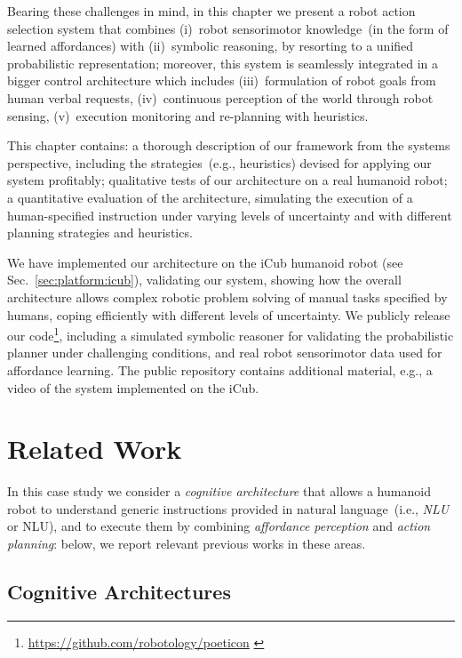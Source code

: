 Bearing these challenges in mind, in this chapter we present a robot action selection system that combines
(i)~robot sensorimotor knowledge~(in the form of learned affordances) with
(ii)~symbolic reasoning, by resorting to a unified probabilistic representation; moreover, this system is seamlessly integrated in a bigger control architecture which includes
(iii)~formulation of robot goals from human verbal requests,
(iv)~continuous perception of the world through robot sensing,
(v)~execution monitoring and re-planning with heuristics.

This chapter contains:
a thorough description of our framework from the systems perspective, including the strategies~(e.g., heuristics) devised for applying our system profitably;
qualitative tests of our architecture on a real humanoid robot;
a quantitative evaluation of the architecture, simulating the execution of a human-specified instruction under varying levels of uncertainty and with different planning strategies and heuristics.

We have implemented our architecture on the iCub humanoid robot (see Sec.~\ref{sec:platform:icub}), validating our system, showing how the overall architecture allows complex robotic problem solving of manual tasks specified by humans, coping efficiently with different levels of uncertainty.
We publicly release our code\footnote{\url{https://github.com/robotology/poeticon} \label{footnote:poeticon_repo}}, including a simulated symbolic reasoner for validating the probabilistic planner under challenging conditions, and real robot sensorimotor data used for affordance learning.
The public repository contains additional material, e.g., a video of the system implemented on the iCub.

\section{Related Work}
\label{sec:poeticon++:related_work}

In this case study we consider a \emph{cognitive architecture} that allows a humanoid robot to understand generic instructions provided in natural language~(i.e., \emph{\acl{NLU}} or \acs{NLU}), and to execute them by combining \emph{affordance perception} and \emph{action planning}: below, we report relevant previous works in these areas.

\subsection{Cognitive Architectures}

